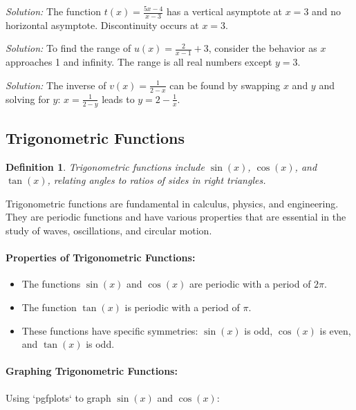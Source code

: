 \documentclass[a4paper,12pt]{book}
\newenvironment{solution}[1][]
{\par\noindent\textit{Solution:} \rmfamily}{\medskip}
\newtheorem{definition}{Definition}
\begin{document}
\begin{solution}[8]
The function \( t(x) = \frac{5x - 4}{x - 3} \) has a vertical asymptote at \( x = 3 \) and no horizontal asymptote. Discontinuity occurs at \( x = 3 \).
\end{solution}

\begin{solution}[9]
To find the range of \( u(x) = \frac{2}{x - 1} + 3 \), consider the behavior as \( x \) approaches 1 and infinity. The range is all real numbers except \( y = 3 \).
\end{solution}

\begin{solution}[10]
The inverse of \( v(x) = \frac{1}{2 - x} \) can be found by swapping \( x \) and \( y \) and solving for \( y \): \( x = \frac{1}{2 - y} \) leads to \( y = 2 - \frac{1}{x} \).
\end{solution}

\subsection{Trigonometric Functions}
\begin{definition}
Trigonometric functions include \( \sin(x) \), \( \cos(x) \), and \( \tan(x) \), relating angles to ratios of sides in right triangles.
\end{definition}

Trigonometric functions are fundamental in calculus, physics, and engineering. They are periodic functions and have various properties that are essential in the study of waves, oscillations, and circular motion.

\paragraph{Properties of Trigonometric Functions:}
\begin{itemize}
    \item The functions \( \sin(x) \) and \( \cos(x) \) are periodic with a period of \( 2\pi \).
    \item The function \( \tan(x) \) is periodic with a period of \( \pi \).
    \item These functions have specific symmetries: \( \sin(x) \) is odd, \( \cos(x) \) is even, and \( \tan(x) \) is odd.
\end{itemize}

\paragraph{Graphing Trigonometric Functions:}
Using `pgfplots` to graph \( \sin(x) \) and \( \cos(x) \):
\end{document}
